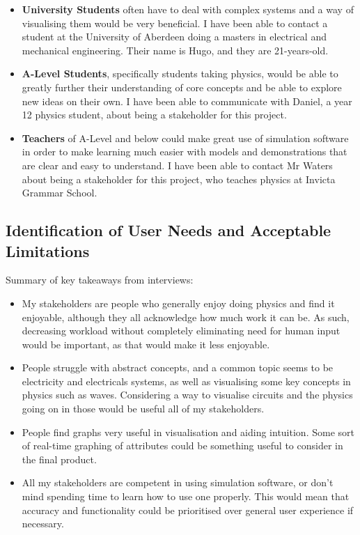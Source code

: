\documentclass[11pt]{article}
\begin{document}
            \begin{itemize}
                \item \textbf{University Students} often have to deal with complex systems and a way of visualising them would be very beneficial. I have been able to contact a student at the University of Aberdeen doing a masters in electrical and mechanical engineering. Their name is Hugo, and they are 21-years-old.
                \item \textbf{A-Level Students}, specifically students taking physics,  would be able to greatly further their understanding of core concepts and be able to explore new ideas on their own. I have been able to communicate with Daniel, a year 12 physics student, about being a stakeholder for this project.
                \item \textbf{Teachers} of A-Level and below could make great use of simulation software in order to make learning much easier with models and demonstrations that are clear and easy to understand. I have been able to contact Mr Waters about being a stakeholder for this project, who teaches physics at Invicta Grammar School.
            \end{itemize}
            
        \subsection{Identification of User Needs and Acceptable Limitations}
            Summary of key takeaways from interviews:
            \begin{itemize}
                \item My stakeholders are people who generally enjoy doing physics and find it enjoyable, although they all acknowledge how much work it can be. As such, decreasing workload without completely eliminating need for human input would be important, as that would make it less enjoyable.
                \item People struggle with abstract concepts, and a common topic seems to be electricity and electricals systems, as well as visualising some key concepts in physics such as waves. Considering a way to visualise circuits and the physics going on in those would be useful all of my stakeholders.
                \item People find graphs very useful in visualisation and aiding intuition. Some sort of real-time graphing of attributes could be something useful to consider in the final product.
                \item All my stakeholders are competent in using simulation software, or don't mind spending time to learn how to use one properly. This would mean that accuracy and functionality could be prioritised over general user experience if necessary. 
            \end{itemize}
\end{document}

